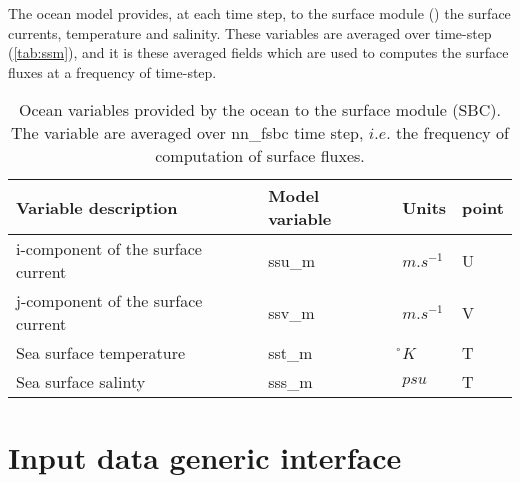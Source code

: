 \documentclass[../tex_main/NEMO_manual]{subfiles}
\begin{document}
The ocean model provides, at each time step, to the surface module () 
the surface currents, temperature and salinity.  
These variables are averaged over  time-step (\autoref{tab:ssm}), 
and it is these averaged fields which are used to computes the surface fluxes 
at a frequency of  time-step.


\begin{table}[tb]   \begin{center}   \begin{tabular}{|l|l|l|l|}
\hline
Variable description					& Model variable	& Units	& point \\	\hline
i-component of the surface current	& ssu\_m	& $m.s^{-1}$	& U \\	\hline
j-component of the surface current	& ssv\_m	& $m.s^{-1}$	& V \\	\hline
Sea surface temperature				& sst\_m	& \r{}$K$		& T \\	\hline
Sea surface salinty					& sss\_m	& $psu$			& T \\	\hline
\end{tabular}
\caption{  \protect\label{tab:ssm}   
Ocean variables provided by the ocean to the surface module (SBC). 
The variable are averaged over nn{\_}fsbc time step, 
$i.e.$ the frequency of computation of surface fluxes.}
\end{center}   \end{table}



\section{Input data generic interface}
\label{sec:SBC_input}
\end{document}
